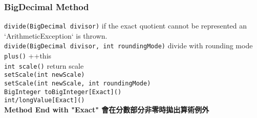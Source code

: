     \subsubsection{BigDecimal Method}
        \lstinline{divide(BigDecimal divisor)} if the exact quotient cannot be represented an `ArithmeticException` is thrown.\\
        \lstinline{divide(BigDecimal divisor, int roundingMode)} divide with rounding mode\\
        \lstinline{plus()} ++this\\
        \lstinline{int scale()} return scale\\
        \lstinline{setScale(int newScale)}\\
        \lstinline{setScale(int newScale, int roundingMode)}\\
        \lstinline{BigInteger toBigInteger[Exact]()}\\
        \lstinline{int/longValue[Exact]()}\\
        \textbf{Method End with "Exact" 會在分數部分非零時拋出算術例外}\\
    